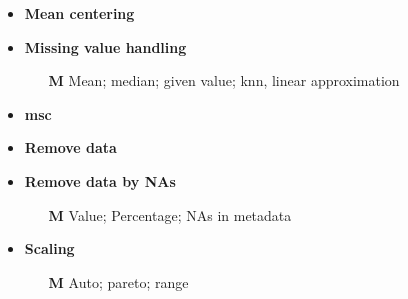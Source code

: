 \begin{multicols}{2}
\begin{itemize}
\begin{itemize}
		\end{itemize}	
		\item \textbf{Mean centering}
		\item \textbf{Missing value handling}
		\begin{itemize}
			\item[\textbf{M}] Mean; median; given value; \gls{knn}, linear approximation
		\end{itemize}
		\item \textbf{\acrlong{msc}}
		\item \textbf{Remove data}
		\item \textbf{Remove data by NAs}
		\begin{itemize}
			\item[\textbf{M}] Value; Percentage; NAs in metadata
		\end{itemize}	
		\item \textbf{Scaling}
		\begin{itemize}
			\item[\textbf{M}] Auto; pareto; range
		\end{itemize}				
	\end{itemize}
\end{multicols}



